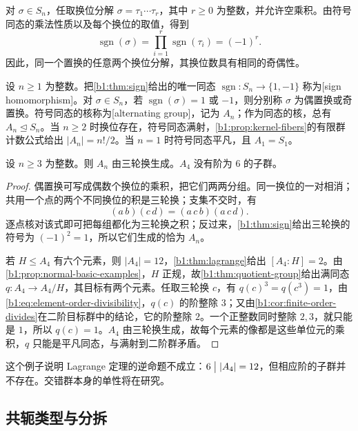 对 \(\sigma\in S_n\)，任取换位分解 \(\sigma=\tau_1\cdots\tau_r\)，其中 \(r\geq0\) 为整数，并允许空乘积。由符号同态的乘法性质以及每个换位的取值，得到
\[
	\operatorname{sgn}(\sigma) =\prod_{i=1}^r\operatorname{sgn}(\tau_i)=(-1)^r.
\]
因此，同一个置换的任意两个换位分解，其换位数具有相同的奇偶性。

\ProseParagraphBreak
设 \(n\geq1\) 为整数。把\cref{b1:thm:sign}给出的唯一同态 \(\operatorname{sgn}:S_n\rightarrow\{1,-1\}\) 称为[sign homomorphism]。对 \(\sigma\in S_n\)，若 \(\operatorname{sgn}(\sigma)=1\) 或 \(-1\)，则分别称 \(\sigma\) 为偶置换或奇置换。符号同态的核称为[alternating group]，记为 \(A_n\)；作为同态的核，总有 \(A_n\trianglelefteq S_n\)。当 \(n\geq2\) 时换位存在，符号同态满射，\cref{b1:prop:kernel-fibers}的有限群计数公式给出 \(\lvert A_n\rvert=n!/2\)。当 \(n=1\) 时符号同态平凡，且 \(A_1=S_1\)。

\begin{proposition}\label{b1:prop:alternating-three-cycles}
	设 \(n\geq3\) 为整数。则 \(A_n\) 由三轮换生成。\(A_4\) 没有阶为 \(6\) 的子群。
\end{proposition}
\begin{proof}
	偶置换可写成偶数个换位的乘积，把它们两两分组。同一换位的一对相消；共用一个点的两个不同换位的积是三轮换；支集不交时，有
	\[
		(a\,b)(c\,d)=(a\,c\,b)(a\,c\,d).
	\]
	逐点核对该式即可把每组都化为三轮换之积；反过来，\cref{b1:thm:sign}给出三轮换的符号为 \((-1)^2=1\)，所以它们生成的恰为 \(A_n\)。

	若 \(H\leq A_4\) 有六个元素，则 \(\lvert A_4\rvert=12\)，\cref{b1:thm:lagrange}给出 \([A_4:H]=2\)。由\cref{b1:prop:normal-basic-examples}，\(H\) 正规，故\cref{b1:thm:quotient-group}给出满同态 \(q:A_4\rightarrow A_4/H\)，其目标有两个元素。任取三轮换 \(c\)，有 \(q(c)^3=q(c^3)=1\)，由\eqref{b1:eq:element-order-divisibility}，\(q(c)\) 的阶整除 \(3\)；又由\cref{b1:cor:finite-order-divides}在二阶目标群中的结论，它的阶整除 \(2\)。一个正整数同时整除 \(2,3\)，就只能是 \(1\)，所以 \(q(c)=1\)。\(A_4\) 由三轮换生成，故每个元素的像都是这些单位元的乘积，\(q\) 只能是平凡同态，与满射到二阶群矛盾。
\end{proof}

这个例子说明 Lagrange 定理的逆命题不成立：\(6\bigm\vert\lvert A_4\rvert=12\)，但相应阶的子群并不存在。交错群本身的单性将在研究。

\subsection{共轭类型与分拆}
\label{b1:subsec:0302:03}

